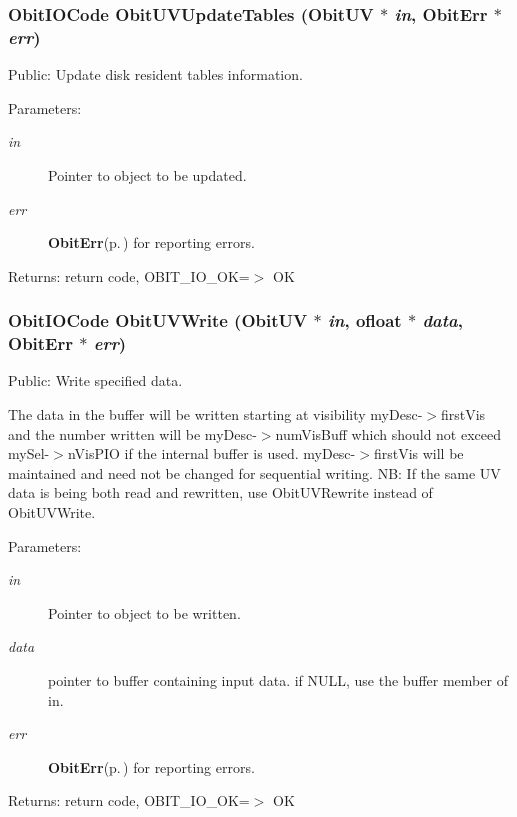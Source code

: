 \subsubsection{\setlength{\rightskip}{0pt plus 5cm}Obit\-IOCode Obit\-UVUpdate\-Tables ({\bf Obit\-UV} $\ast$ {\em in}, {\bf Obit\-Err} $\ast$ {\em err})}\label{ObitUV_8h_a48}


Public: Update disk resident tables information. 

\begin{Desc}
\item[Parameters:]
\begin{description}
\item[{\em in}]Pointer to object to be updated. \item[{\em err}]{\bf Obit\-Err}{\rm (p.\,\pageref{structObitErr})} for reporting errors. \end{description}
\end{Desc}
\begin{Desc}
\item[Returns:]return code, OBIT\_\-IO\_\-OK=$>$ OK \end{Desc}
\subsubsection{\setlength{\rightskip}{0pt plus 5cm}Obit\-IOCode Obit\-UVWrite ({\bf Obit\-UV} $\ast$ {\em in}, {\bf ofloat} $\ast$ {\em data}, {\bf Obit\-Err} $\ast$ {\em err})}\label{ObitUV_8h_a43}


Public: Write specified data. 

The data in the buffer will be written starting at visibility my\-Desc-$>$first\-Vis and the number written will be my\-Desc-$>$num\-Vis\-Buff which should not exceed my\-Sel-$>$n\-Vis\-PIO if the internal buffer is used. my\-Desc-$>$first\-Vis will be maintained and need not be changed for sequential writing. NB: If the same UV data is being both read and rewritten, use Obit\-UVRewrite instead of Obit\-UVWrite. \begin{Desc}
\item[Parameters:]
\begin{description}
\item[{\em in}]Pointer to object to be written. \item[{\em data}]pointer to buffer containing input data. if NULL, use the buffer member of in. \item[{\em err}]{\bf Obit\-Err}{\rm (p.\,\pageref{structObitErr})} for reporting errors. \end{description}
\end{Desc}
\begin{Desc}
\item[Returns:]return code, OBIT\_\-IO\_\-OK=$>$ OK \end{Desc}
